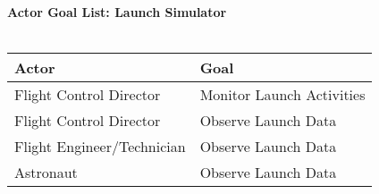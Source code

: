 \documentclass[letterpaper]{article}
\begin{document}
\noindent
\textbf{Actor Goal List: Launch Simulator}\\\\
\vspace{4ex}
\begin{tabular}{|p{5cm}|p{5cm}|}\hline
\textbf{Actor} & \textbf{Goal}\\\hline
Flight Control Director & Monitor Launch Activities\\\hline
Flight Control Director & Observe Launch Data\\\hline
Flight Engineer/Technician & Observe Launch Data\\\hline
Astronaut & Observe Launch Data\\\hline
\end{tabular}
\end{document}
